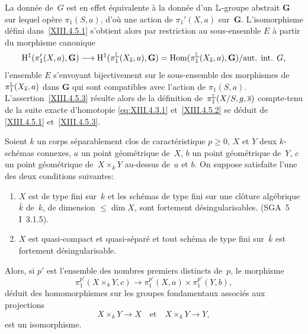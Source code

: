 La donn\'ee de~$G$ est en effet \'equivalente \`a la donn\'ee
d'un $\mathbb{L}$-groupe abstrait $\mathbf{G}$
sur lequel op\`ere $\pi_1(S,a)$, d'o\`u une action de
$\pi_1'(X,a)$ sur~$\mathbf{G}$. L'isomorphisme d\'efini
dans~\ref{XIII.4.5.1} s'obtient alors par restriction au sous-ensemble
$E$ \`a partir du morphisme canonique
\[
\H^1(\pi_1'(X,a),\mathbf{G})\to
\H^1(\pi_1^\LL(X_{\bar{s}},a),\mathbf{G}) =
\Hom(\pi_1^\LL(X_{\bar{s}},a),\mathbf{G})/\text{aut. int. }G,
\]
l'ensemble $E$ s'envoyant bijectivement sur le sous-ensemble des
morphismes de $\pi_1^{\mathbb{L}}(X_{\overline{s}},a)$ dans $\mathbf{G}$ qui sont
compatibles avec l'action de
$\pi_1(S,a)$. L'assertion~\ref{XIII.4.5.3} r\'esulte alors de la
d\'efinition de~$\pi_1^{\mathbb{L}}(X/S,g,\overline{s})$ compte-tenu de la suite
exacte d'homotopie \eqref{eq:XIII.4.3.1} et~\ref{XIII.4.5.2} se
d\'eduit de \ref{XIII.4.5.1} et~\ref{XIII.4.5.3}.

\begin{proposition}
\label{XIII.4.6}
Soient $k$ un corps s\'eparablement clos de caract\'eristique
$p\geq 0$, $X$ et $Y$ deux $k$-sch\'emas connexes, $a$ un point
g\'eom\'etrique de~$X$, $b$ un point g\'eom\'etrique de~$Y$,
$c$ un point g\'eom\'etrique de~$X\times_k Y$ au-dessus de~$a$ et
$b$. On suppose satisfaite l'une des deux conditions suivantes:
\begin{enumerate}
\item[a)] $X$ est de type fini sur~$k$ et les sch\'emas de type fini
sur une cl\^oture alg\'ebrique $\bar{k}$ de~$k$, de dimension
$\leq\dim X$, sont fortement d\'esingularisables. \textup{(SGA~5 I~3.1.5)}.
\item[b)] $X$ est quasi-compact et quasi-s\'epar\'e et tout
sch\'ema de type fini sur~$\bar{k}$ est fortement
d\'esingularisable.
\end{enumerate}

Alors, si $p'$ est l'ensemble des nombres premiers distincts de~$p$,
le morphisme
\begin{equation*}
\label{eq:XIII.4.6.0} \tag{\thesubsection.0} {}
\pi_1^{p'}(X\times_k Y,c)\to\pi_1^{p'}(X,a)\times\pi_1^{p'}(Y,b),
\end{equation*}
d\'eduit
des homomorphismes sur les groupes fondamentaux associ\'es aux
projections
$$
X\times_k Y\to X \quad \text{et} \quad X\times_k Y\to Y,
$$
est un isomorphisme.
\end{proposition}

